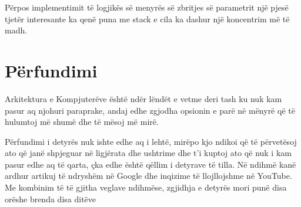 \documentclass[11pt]{article}
\begin{document}
\vspace{1cm}
Përpos implementimit të
logjikës së menyrës së zbritjes së parametrit
një pjesë tjetër interesante ka
qenë puna me stack e cila ka dashur një koncentrim më të madh.
\vspace{2cm}
\newpage
\section{Përfundimi}
Arkitektura e Kompjuterëve është ndër lëndët e vetme deri tash ku nuk kam pasur aq njohuri
paraprake, andaj edhe zgjodha opsionin e parë në mënyrë që të hulumtoj më shumë dhe të mësoj
më mirë.

Përfundimi i detyrës nuk ishte edhe aq i lehtë, mirëpo kjo ndikoi që të përvetësoj ato që janë
shpjeguar në ligjërata dhe ushtrime dhe t’i kuptoj ato që nuk i kam pasur edhe aq të qarta, çka edhe
është qëllim i detyrave të tilla.
Në ndihmë kanë ardhur artikuj të ndryshëm në Google dhe inqizime të llojllojshme në YouTube.
Me kombinim të të gjitha veglave ndihmëse, zgjidhja e detyrës mori punë disa orëshe brenda disa
ditëve
\end{document}
